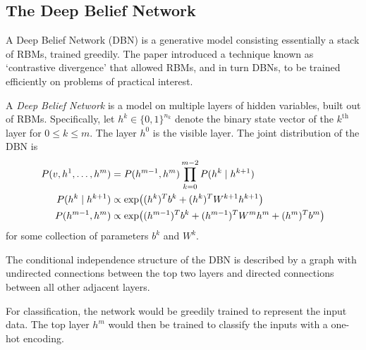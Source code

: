 \documentclass[11pt,titlepage]{article}
\numberwithin{equation}{section}
\begin{document}
\subsection{The Deep Belief Network}
    A Deep Belief Network (DBN) is a generative model consisting essentially a
    stack of RBMs, trained greedily.  The paper \cite{Hin07} introduced a
    technique known as `contrastive divergence' that allowed RBMs, and in turn
    DBNs, to be trained efficiently on problems of practical interest.
    \begin{definition}
    A \emph{Deep Belief Network} is a model on multiple layers of hidden
    variables, built out of RBMs.  Specifically, let $h^k \in \{0,1\}^{n_k}$
    denote the binary state vector of the $k^{\text{th}}$ layer for $0 \le k \le
    m$.  The layer $h^0$ is the visible layer.  The joint distribution of the
    DBN is
    \begin{align*}
        P(v,h^1, \ldots, h^m) &= P(h^{m-1}, h^m) \prod_{k=0}^{m-2} P(h^k \mid h^{k+1})\\
        P(h^k\mid h^{k+1}) &\propto \exp\pdil*{(h^k)^Tb^k + (h^k)^T W^{k+1} h^{k+1}}\\
        P(h^{m-1}, h^{m}) &\propto  \exp\pdil*{(h^{m-1})^T b^k + (h^{m-1})^T W^m
        h^m + (h^m)^T b^m}
    \end{align*}
    for some collection of parameters $b^k$ and $W^k$.
    \end{definition}

    The conditional independence structure of the DBN is described by a graph
    with undirected connections between the top two layers and directed
    connections between all other adjacent layers.
    \begin{center}
    \end{center}
    For classification, the network would be greedily trained to represent the
    input data.  The top layer $h^m$ would then be trained to classify the
    inputs with a one-hot encoding.
\end{document}
